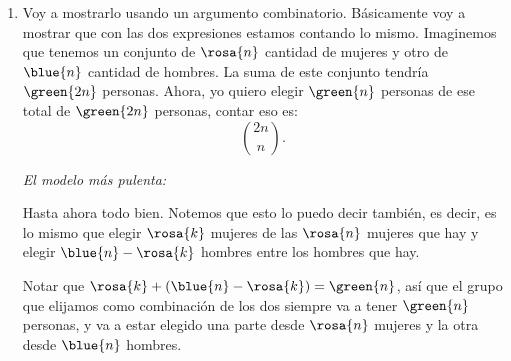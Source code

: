 \begin{enumerate}[label=\alph*)]
  \item
        Voy a mostrarlo usando un argumento combinatorio. Básicamente voy a mostrar que con las dos expresiones estamos contando lo mismo.
        Imaginemos que tenemos un conjunto de $\rosa{n}$ cantidad de mujeres y otro de $\blue{n}$ cantidad de hombres.
        La suma de este conjunto tendría $\green{2n}$ personas. Ahora, yo quiero elegir $\green{n}$ personas de ese total
        de $\green{2n}$ personas, contar eso es:
        $$
          \binom{2n}{n}.
        $$

        \bigskip


        \bigskip

        \textit{El modelo más pulenta:}

        Hasta ahora todo bien. Notemos que esto lo puedo decir también, es decir, es lo mismo que elegir
        $\rosa{k}$ mujeres de las $\rosa{n}$ mujeres que hay y elegir $\blue{n} - \rosa{k}$ hombres entre los  hombres que hay.

        Notar que $\rosa{k} + (\blue{n} - \rosa{k}) = \green{n}$, así que el grupo que elijamos como combinación
        de los dos siempre va a tener $\green{n}$ personas, y va a estar elegido una parte desde $\rosa{n}$ mujeres y la otra desde $\blue{n}$ hombres.


\end{enumerate}
